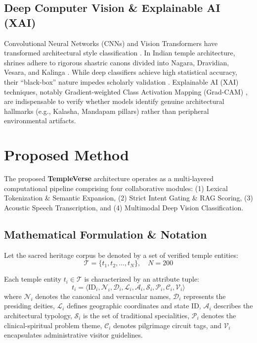 \documentclass[lettersize,journal]{IEEEtran}
\begin{document}
\subsection{Deep Computer Vision \& Explainable AI (XAI)}
Convolutional Neural Networks (CNNs) and Vision Transformers have transformed architectural style classification \cite{he2016deep,dosovitskiy2020image}. In Indian temple architecture, shrines adhere to rigorous shastric canons divided into Nagara, Dravidian, Vesara, and Kalinga \cite{hardy1995indian}. While deep classifiers achieve high statistical accuracy, their ``black-box'' nature impedes scholarly validation \cite{rudin2019stop}. Explainable AI (XAI) techniques, notably Gradient-weighted Class Activation Mapping (Grad-CAM) \cite{selvaraju2017grad}, are indispensable to verify whether models identify genuine architectural hallmarks (e.g., Kalasha, Mandapam pillars) rather than peripheral environmental artifacts.

\section{Proposed Method}
The proposed \textbf{TempleVerse} architecture operates as a multi-layered computational pipeline comprising four collaborative modules: (1) Lexical Tokenization \& Semantic Expansion, (2) Strict Intent Gating \& RAG Scoring, (3) Acoustic Speech Transcription, and (4) Multimodal Deep Vision Classification.

\subsection{Mathematical Formulation \& Notation}
Let the sacred heritage corpus be denoted by a set of verified temple entities:
\begin{equation}
\mathcal{T} = \{t_1, t_2, \dots, t_N\}, \quad N = 200
\end{equation}

Each temple entity $t_i \in \mathcal{T}$ is characterized by an attribute tuple:
\begin{equation}
t_i = \langle \text{ID}_i, \mathcal{N}_i, \mathcal{D}_i, \mathcal{L}_i, \mathcal{A}_i, \mathcal{S}_i, \mathcal{P}_i, \mathcal{C}_i, \mathcal{V}_i \rangle
\end{equation}
where $\mathcal{N}_i$ denotes the canonical and vernacular names, $\mathcal{D}_i$ represents the presiding deities, $\mathcal{L}_i$ defines geographic coordinates and state ID, $\mathcal{A}_i$ describes the architectural typology, $\mathcal{S}_i$ is the set of traditional specialities, $\mathcal{P}_i$ denotes the clinical-spiritual problem theme, $\mathcal{C}_i$ denotes pilgrimage circuit tags, and $\mathcal{V}_i$ encapsulates administrative visitor guidelines.
\end{document}
